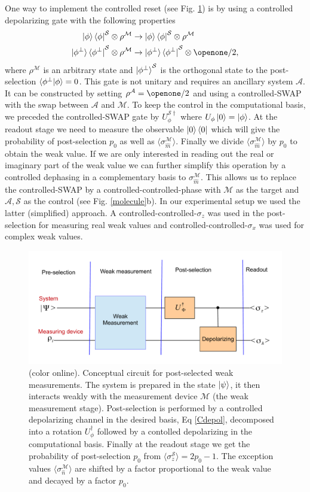 \documentclass[aps,pra,12pt,onecolumn,showpacs,superscriptaddress,floatfix,footinbib,subfigure]{revtex4}
\def\bra#1{\mathinner{\langle{#1}|}}
\def\ket#1{\mathinner{|{#1}\rangle}}
\def\braket#1{\mathinner{\langle{#1}\rangle}}
\def\braket#1#2{\mathinner{\langle{#1}|{#2}\rangle}}
\def\es{{\mathcal{S}}}
\def\md{{\mathcal{M}}}
\def\ea{{\mathcal{A}}}
\def\sn{ \sigma_{ \hat{n} } }
\def\kb#1{\ket{#1}\bra{#1}}
\begin{document}
One way to implement the controlled reset  (see Fig. \ref{circuit})  is by using a controlled depolarizing gate with the following properties
\begin{align}\label{Cdepol}
\ket{\phi}\bra{\phi}^\es\otimes\rho^\md&\rightarrow \ket{\phi}\bra{\phi}^\es\otimes\rho^\md \nonumber\\
\kb{\phi^\perp}^\es\otimes\rho^\md &\rightarrow \kb{\phi^\perp}^\es\otimes\openone/2,
\end{align}
where  $\rho^\md$ is an arbitrary state and $\ket{\phi^\perp}^\es$ is the orthogonal state to the post-selection  $\braket{\phi^\perp}{\phi}=0$. This gate is not unitary and requires an ancillary system $\ea$. It can be  constructed  by setting $\rho^\ea=\openone/2$ and using a controlled-SWAP with the swap between $\ea$ and $\md$. To keep the control in the computational basis, we  preceded the controlled-SWAP gate by $U_\phi^{\es\dagger}$ where $U_\phi\ket{0}=\ket{\phi}$.  At the readout stage we  need to measure the observable $\kb{0}$ which will give the probability of post-selection $p_0$ as well as $\langle\sigma_{\hat{m}}^\md\rangle$. Finally we divide $\langle\sigma_{\hat{m}}^\md\rangle$  by $p_0$ to obtain the  weak value. If we are  only interested in reading out the real or imaginary part of the weak value we can further simplify this operation by a controlled dephasing in a complementary basis to $\sigma_{\hat{m}}^\md$. This allows us to replace the controlled-SWAP by a controlled-controlled-phase with $\md$ as the target and $\ea,\es$ as the control (see Fig. \ref{molecule}b). In our experimental setup  we  used the latter (simplified) approach.  A controlled-controlled-$\sigma_z$ was used in the post-selection for measuring real weak values and controlled-controlled-$\sigma_x$ was used for  complex weak values.

\begin{figure}[h] \centering
\includegraphics[width=\columnwidth]{Theory.pdf}
\caption{(color online). Conceptual circuit for  post-selected weak measurements. The system is prepared in the state $\ket{\psi}$, it then interacts weakly with the measurement device $\md$ (the weak measurement stage). Post-selection is performed by a controlled depolarizing channel in the desired basis, Eq \eqref{Cdepol}, decomposed into a rotation $U^\dagger_\phi$ followed by a contolled depolarizing in the computational basis. Finally at the readout stage we get the probability of post-selection $p_0$ from   $\langle\sigma_z^\es\rangle=2p_0-1$. The exception values $\langle\sn^\md\rangle$  are  shifted by a factor proportional to the weak value and decayed by a factor $p_0$. }\label{circuit}
\end{figure}
\end{document}
